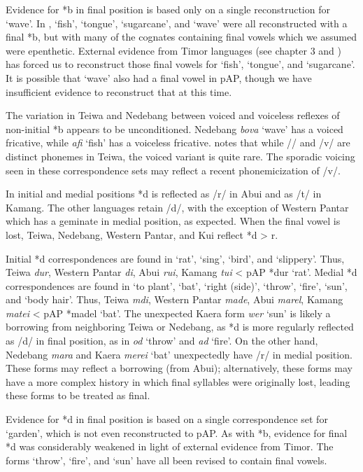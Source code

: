 Evidence for *b in final position is based only on a single reconstruction for `wave'. In \citep{HoltonEtAl2012}, `fish', `tongue', `sugarcane', and `wave' were all reconstructed with a final *b, but with many of the cognates containing final vowels which we assumed were epenthetic. External evidence from Timor languages (see chapter 3 and \citet{SchapperEtAl}) has forced us to reconstruct those final vowels for `fish', `tongue', and `sugarcane'. It is possible that `wave' also had a final vowel in pAP, though we have insufficient evidence to reconstruct that at this time.

The variation in Teiwa and Nedebang between voiced and voiceless reflexes of non-initial *b appears to be unconditioned. Nedebang \textit{bova }`wave' has a voiced fricative, while \textit{a{\textlengthmark}fi} `fish' has a voiceless fricative. \citet[38]{Klamer2010} notes that while /{\textphi}/ and /v/ are distinct phonemes in Teiwa, the voiced variant is quite rare. The sporadic voicing seen in these correspondence sets may reflect a recent phonemicization of /v/.

In initial and medial positions *d is reflected as /r/ in Abui and as /t/ in Kamang. The other languages retain /d/, with the exception of Western Pantar which has a geminate in medial position, as expected. When the final vowel is lost, Teiwa, Nedebang, Western Pantar, and Kui reflect *d {\textgreater} r.

Initial *d correspondences are found in `rat', `sing', `bird', and `slippery'. Thus, Teiwa \textit{dur}, Western Pantar \textit{di}, Abui \textit{rui}, Kamang \textit{tui} {\textless} pAP *dur `rat'. Medial *d correspondences are found in `to plant', `bat', `right (side)', `throw', `fire', `sun', and `body hair'. Thus, Teiwa \textit{m{\textschwa}di}, Western Pantar \textit{mad{\textlengthmark}e}, Abui \textit{marel}, Kamang \textit{matei} {\textless} pAP *madel\textit{ }`bat'. The unexpected Kaera form \textit{wer }`sun' is likely a borrowing from neighboring Teiwa or Nedebang, as *d is more regularly reflected as /d/ in final position, as in \textit{od }`throw' and \textit{ad }`fire'. On the other hand, Nedebang \textit{mara }and Kaera \textit{merei} `bat' unexpectedly have /r/ in medial position. These forms may reflect a borrowing (from Abui); alternatively, these forms may have a more complex history in which final syllables were originally lost, leading these forms to be treated as final.

Evidence for *d in final position is based on a single correspondence set for `garden', which is not even reconstructed to pAP. As with *b, evidence for final *d was considerably weakened in light of external evidence from Timor. The forms `throw', `fire', and `sun' have all been revised to contain final vowels.

